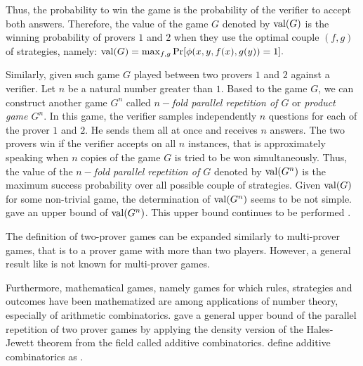 Thus, the probability to win  the game is the probability of the verifier to accept both answers.  Therefore, the value of the game $G$ denoted by $\mathrm{val} (G)$ is the winning probability of provers $1$ and $2$ when they use the optimal couple $(f,g)$ of strategies, namely: $\mathrm{val} (G)= \max_{f,g} \mathrm{Pr}[\phi (x,y,f(x),g(y))=1].$ 

Similarly, given such game $G$ played between two provers $1$ and $2$ against a verifier. Let $n$ be a natural number greater than $1.$ Based to the game $G$,
we can construct another game $G^n$ called $n-$\textit{fold parallel repetition of $G$} or \textit{product game $G^n$}. In this game, the verifier samples independently $n$ questions for each of the prover $1$ and $2.$ He sends them all at once and receives $n$ answers. The two provers win if the verifier accepts on all $n$ instances, that is approximately speaking when $n$ copies of the game $G$ is tried to be won simultaneously.
Thus, the value of the $n-$\textit{fold parallel repetition of $G$} denoted by $\mathrm{val} (G^n)$ is the maximum success probability over all possible couple of strategies. Given $\mathrm{val} (G)$ for some non-trivial game, the determination of $\mathrm{val} (G^n)$ seems to be not simple. \cite{raz1998parallel} gave an upper bound of $\mathrm{val} (G^n)$.
This upper bound  continues to be performed
\citep{holenstein2007parallel, raz2012strong, dinur2014analytical, dinur2016multiplayer}.

The definition of two-prover games can be expanded similarly to multi-prover games, that is to a prover game with more than two players. However, a general result like \cite{raz1998parallel} is not known for multi-prover games.

Furthermore, mathematical games, namely games for which rules, strategies and outcomes have been mathematized are among applications of number theory,
especially of arithmetic combinatorics.
\cite{verbitsky1996towards} gave a general  upper bound of the parallel repetition of  two prover games by applying the density version of the Hales-Jewett theorem from the field called additive combinatorics. \cite*{taoadditive} define
additive combinatorics  as  .

